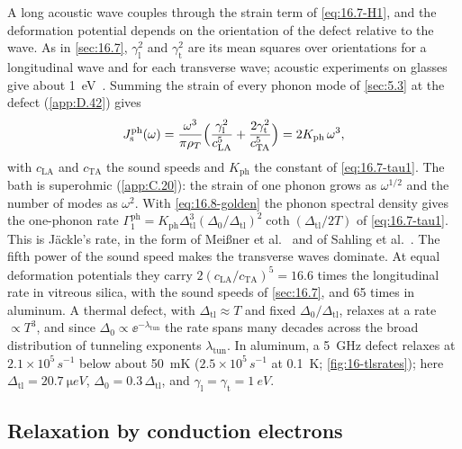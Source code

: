 A long acoustic wave couples through the strain term of \cref{eq:16.7-H1}, and the deformation potential depends on the orientation of the defect relative to the wave. As in \cref{sec:16.7}, $\gamma_{\mathrm{l}}^2$ and $\gamma_{\mathrm{t}}^2$ are its mean squares over orientations for a longitudinal wave and for each transverse wave; acoustic experiments on glasses give about \SI{1}{eV}~\cite[Sect.~IV\,A]{muller2019towards}. Summing the strain of every phonon mode of \cref{sec:5.3} at the defect (\cref{app:D.42}) gives
\begin{equation}
  J_{\mathrm{s}}^{\mathrm{ph}}(\omega) = \frac{\omega^3}{\pi\rho_T}\Bigl(\frac{\gamma_{\mathrm{l}}^2}{c_{\mathrm{LA}}^5} + \frac{2\gamma_{\mathrm{t}}^2}{c_{\mathrm{TA}}^5}\Bigr) = 2K_{\mathrm{ph}}\,\omega^3 ,
  \label{eq:16.8-Jph}
\end{equation}
with $c_{\mathrm{LA}}$ and $c_{\mathrm{TA}}$ the sound speeds and $K_{\mathrm{ph}}$ the constant of \cref{eq:16.7-tau1}. The bath is superohmic (\cref{app:C.20}): the strain of one phonon grows as $\omega^{1/2}$ and the number of modes as $\omega^2$. With \cref{eq:16.8-golden} the phonon spectral density gives the one-phonon rate $\varGamma_1^{\mathrm{ph}} = K_{\mathrm{ph}}\Delta_{\mathrm{tl}}^3(\Delta_0/\Delta_{\mathrm{tl}})^2\coth(\Delta_{\mathrm{tl}}/2T)$ of \cref{eq:16.7-tau1}. This is Jäckle's rate, in the form of Meißner et al.~\cite[Eq.~(7)]{meissner2021acoustic} and of Sahling et al.~\cite[Eqs.~(4), (5)]{sahling2010anomalous}. The fifth power of the sound speed makes the transverse waves dominate. At equal deformation potentials they carry $2(c_{\mathrm{LA}}/c_{\mathrm{TA}})^5 = 16.6$ times the longitudinal rate in vitreous silica, with the sound speeds of \cref{sec:16.7}, and 65 times in aluminum. A thermal defect, with $\Delta_{\mathrm{tl}} \approx T$ and fixed $\Delta_0/\Delta_{\mathrm{tl}}$, relaxes at a rate $\propto T^3$, and since $\Delta_0 \propto \ee^{-\lambda_{\mathrm{tun}}}$ the rate spans many decades across the broad distribution of tunneling exponents $\lambda_{\mathrm{tun}}$. In aluminum, a \SI{5}{GHz} defect relaxes at $2.1\times10^5\,\si{s^{-1}}$ below about \SI{50}{mK} ($2.5\times10^5\,\si{s^{-1}}$ at \SI{0.1}{K}; \cref{fig:16-tlsrates}); here $\Delta_{\mathrm{tl}} = \SI{20.7}{\micro eV}$, $\Delta_0 = 0.3\,\Delta_{\mathrm{tl}}$, and $\gamma_{\mathrm{l}} = \gamma_{\mathrm{t}} = \SI{1}{eV}$.

\subsection{Relaxation by conduction electrons}\label{sec:16.8-electron}

